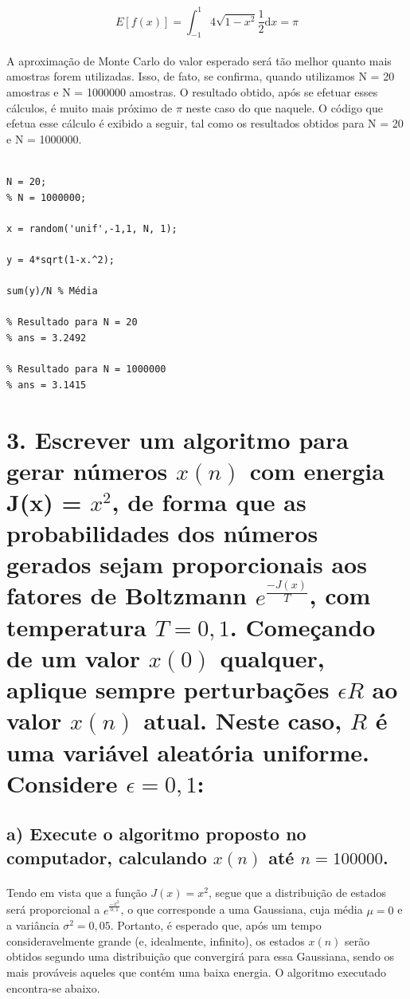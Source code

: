 \documentclass{report}
\begin{document}
\begin{equation}
E[f(x)] = \int_{-1}^{1} \! 4\sqrt{1-x^2}\frac{1}{2}\mathrm{d}x = \pi
\end{equation}

\paragraph{} A aproximação de Monte Carlo do valor esperado será tão melhor quanto mais amostras forem utilizadas. Isso, de fato, se confirma, quando utilizamos N = 20 amostras e N = 1000000 amostras. O resultado obtido, após se efetuar esses cálculos, é muito mais próximo de $\pi$ neste caso do que naquele. O código que efetua esse cálculo é exibido a seguir, tal como os resultados obtidos para N = 20 e N = 1000000.

\begin{verbatim}

N = 20;
% N = 1000000;

x = random('unif',-1,1, N, 1);

y = 4*sqrt(1-x.^2);

sum(y)/N % Média

% Resultado para N = 20
% ans = 3.2492

% Resultado para N = 1000000
% ans = 3.1415

\end{verbatim}

\section*{3. Escrever um algoritmo para gerar números $x(n)$ com energia J(x) = $x^2$, de forma que as probabilidades dos números gerados sejam proporcionais aos fatores de Boltzmann $e^{\frac{-J(x)}{T}}$, com temperatura $T = 0,1$. Começando de um valor $x(0)$ qualquer, aplique sempre perturbações $\epsilon R$ ao valor $x(n)$ atual. Neste caso, $R$ é uma variável aleatória uniforme. Considere $\epsilon = 0,1$:}

\subsection*{a) Execute o algoritmo proposto no computador, calculando $x(n)$ até $n = 100000$.}

\paragraph{} Tendo em vista que a função $J(x) = x^2$, segue que a distribuição de estados será proporcional a $e^{\frac{- x^2}{0,1}}$, o que corresponde a uma Gaussiana, cuja média $\mu = 0$ e a variância $\sigma^2 = 0,05$. Portanto, é esperado que, após um tempo consideravelmente grande (e, idealmente, infinito), os estados $x(n)$ serão obtidos segundo uma distribuição que convergirá para essa Gaussiana, sendo os mais prováveis aqueles que contém uma baixa energia. O algoritmo executado encontra-se abaixo.
\end{document}
